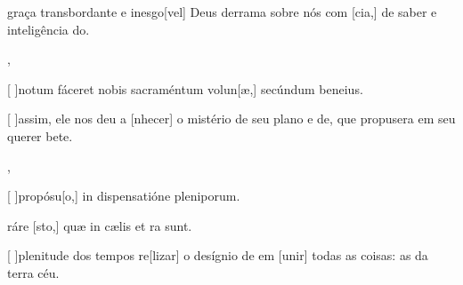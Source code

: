 {    {\item {} graça transbordante e inesgo[vel] Deus derrama sobre nós com [cia,] de saber e inteligência do.},
  {\item {}[ ]{no}tum fáceret nobis sacraméntum volun[æ,] secúndum beneius.}%
    {\item {}[ ]{as}sim, ele nos deu a [nhecer] o mistério de seu plano e de, que propusera em seu querer bete.},
  {\item {}[ ]{pro}pósu[o,] in dispensatióne pleniporum.
      \item {}ráre [sto,] quæ in cælis et ra sunt.}%
    {\item {}[ ]{ple}nitude dos tempos re[lizar] o desígnio de em [unir] todas as coisas: as da terra  céu.}
}